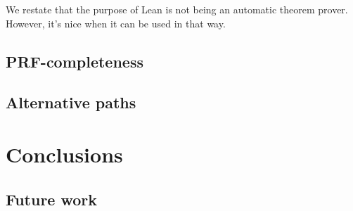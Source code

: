 \documentclass{book}
\theoremstyle{definition}
\theoremstyle{remark}
\theoremstyle{plain}
\begin{document}
We restate that the purpose of Lean is not being an automatic theorem prover.
However, it's nice when it can be used in that way.

\section{PRF-completeness}

\section{Alternative paths}

\chapter{Conclusions}

\section{Future work}
\end{document}
